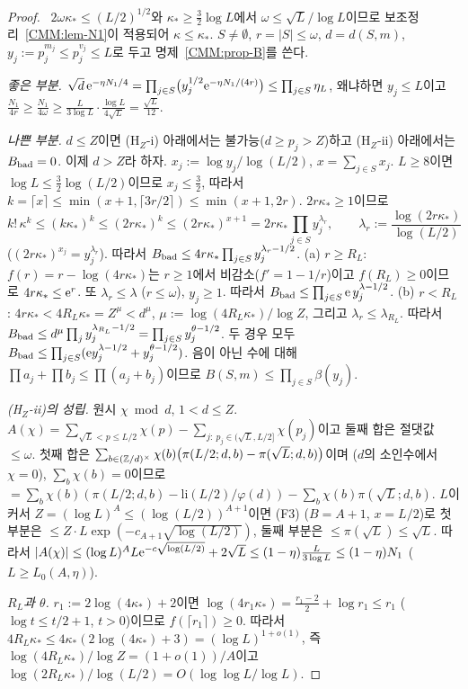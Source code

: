 \begin{proof}
\PROVED\ $2\omega\kappa_*\le(L/2)^{1/2}$와 $\kappa_*\ge\frac32\log L$에서 $\omega\le\sqrt L/\log L$이므로 보조정리~\ref{CMM:lem-N1}이 적용되어 $\kappa\le\kappa_*$.
$S\ne\emptyset$, $r=|S|\le\omega$, $d=d(S,m)$, $y_j:=p_j^{m_j}\le p_j^{v_j}\le L$로 두고 명제~\ref{CMM:prop-B}를 쓴다.

\emph{좋은 부분.} $\sqrt d\,\mathrm{e}^{-\eta N_1/4}=\prod_{j\in S}\bigl(y_j^{1/2}\mathrm{e}^{-\eta N_1/(4r)}\bigr)\le\prod_{j\in S}\eta_L$,
왜냐하면 $y_j\le L$이고 $\frac{N_1}{4r}\ge\frac{N_1}{4\omega}\ge\frac{L}{3\log L}\cdot\frac{\log L}{4\sqrt L}=\frac{\sqrt L}{12}$.

\emph{나쁜 부분.} $d\le Z$이면 (H$_Z$-i) 아래에서는 불가능($d\ge p_j>Z$)하고 (H$_Z$-ii) 아래에서는 $B_{\rm bad}=0$. 이제 $d>Z$라 하자.
$x_j:=\log y_j/\log(L/2)$, $x=\sum_{j\in S}x_j$. $L\ge8$이면 $\log L\le\frac32\log(L/2)$이므로 $x_j\le\frac32$, 따라서
$k=\lceil x\rceil\le\min(x+1,\lceil 3r/2\rceil)\le\min(x+1,2r)$. $2r\kappa_*\ge1$이므로
\[
k!\,\kappa^k\le(k\kappa_*)^k\le(2r\kappa_*)^k\le(2r\kappa_*)^{x+1}=2r\kappa_*\prod_{j\in S}y_j^{\lambda_r},\qquad \lambda_r:=\frac{\log(2r\kappa_*)}{\log(L/2)}
\]
($(2r\kappa_*)^{x_j}=y_j^{\lambda_r}$). 따라서 $B_{\rm bad}\le4r\kappa_*\prod_{j\in S}y_j^{\lambda_r-1/2}$.
(a) $r\ge R_L$: $f(r)=r-\log(4r\kappa_*)$는 $r\ge1$에서 비감소($f'=1-1/r$)이고 $f(R_L)\ge0$이므로 $4r\kappa_*\le\mathrm{e}^r$.
또 $\lambda_r\le\lambda$ ($r\le\omega$), $y_j\ge1$. 따라서 $B_{\rm bad}\le\prod_{j\in S}\mathrm{e}\,y_j^{\lambda-1/2}$.
(b) $r<R_L$: $4r\kappa_*<4R_L\kappa_*=Z^{\mu}<d^{\mu}$, $\mu:=\log(4R_L\kappa_*)/\log Z$, 그리고 $\lambda_r\le\lambda_{R_L}$. 따라서
$B_{\rm bad}\le d^{\mu}\prod_j y_j^{\lambda_{R_L}-1/2}=\prod_{j\in S}y_j^{\theta-1/2}$.
두 경우 모두 $B_{\rm bad}\le\prod_{j\in S}(\mathrm{e} y_j^{\lambda-1/2}+y_j^{\theta-1/2})$. 음이 아닌 수에 대해
$\prod a_j+\prod b_j\le\prod(a_j+b_j)$이므로 $B(S,m)\le\prod_{j\in S}\beta(y_j)$.

\emph{(H$_Z$-ii)의 성립.} 원시 $\chi\bmod d$, $1<d\le Z$. $A(\chi)=\sum_{\sqrt L<p\le L/2}\chi(p)-\sum_{j:\ p_j\in(\sqrt L,L/2]}\chi(p_j)$이고 둘째 합은
절댓값 $\le\omega$. 첫째 합은 $\sum_{b\in(\mathbb{Z}/d)^\times}\chi(b)\bigl(\pi(L/2;d,b)-\pi(\sqrt L;d,b)\bigr)$이며 ($d$의 소인수에서 $\chi=0$),
$\sum_b\chi(b)=0$이므로 $=\sum_b\chi(b)(\pi(L/2;d,b)-\mathrm{li}(L/2)/\varphi(d))-\sum_b\chi(b)\pi(\sqrt L;d,b)$.
$L$이 커서 $Z=(\log L)^A\le(\log(L/2))^{A+1}$이면 (F3) ($B=A+1$, $x=L/2$)로 첫 부분은 $\le Z\cdot L\exp(-c_{A+1}\sqrt{\log(L/2)})$,
둘째 부분은 $\le\pi(\sqrt L)\le\sqrt L$. 따라서 $|A(\chi)|\le(\log L)^AL\mathrm{e}^{-c\sqrt{\log(L/2)}}+2\sqrt L\le(1-\eta)\frac{L}{3\log L}\le(1-\eta)N_1$
($L\ge L_0(A,\eta)$).

\emph{$R_L$과 $\theta$.} $r_1:=2\log(4\kappa_*)+2$이면 $\log(4r_1\kappa_*)=\frac{r_1-2}2+\log r_1\le r_1$ ($\log t\le t/2+1$, $t>0$)이므로 $f(\lceil r_1\rceil)\ge0$.
따라서 $4R_L\kappa_*\le4\kappa_*(2\log(4\kappa_*)+3)=(\log L)^{1+o(1)}$, 즉 $\log(4R_L\kappa_*)/\log Z=(1+o(1))/A$이고
$\log(2R_L\kappa_*)/\log(L/2)=O(\log\log L/\log L)$.
\end{proof}

